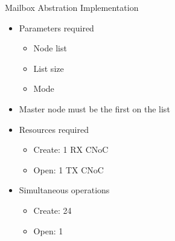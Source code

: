 		\begin{frame}[fragile]{Mailbox Abstration Implementation}
			\begin{itemize}
				\item Parameters required
				\begin{itemize}
					\item Node list
					\item List size
					\item Mode
				\end{itemize}
				\item Master node must be the first on the list
			\end{itemize}

			\begin{itemize}
				\item Resources required
				\begin{itemize}
					\item Create: 1 RX CNoC
					\item Open: 1 TX CNoC
				\end{itemize}
			\end{itemize}

			\begin{itemize}
				\item Simultaneous operations
				\begin{itemize}
					\item Create: 24
					\item Open: 1
				\end{itemize}
			\end{itemize}
		\end{frame}


